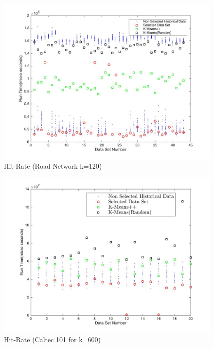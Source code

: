 \begin{figure}[h!]
    \includegraphics[width=\textwidth]{Chapter-5/figs/road_240}
    \caption{Hit-Rate (Road Network k=120)}
    \centering
    \label{fig:gas_240_selection}
\end{figure}

\begin{figure}[t!]
    \includegraphics[width=\textwidth]{Chapter-5/figs/nnData_600}
    \caption{Hit-Rate (Caltec 101 for k=600)}
    \centering
    \label{fig:caltec_600_selection}
\end{figure}

